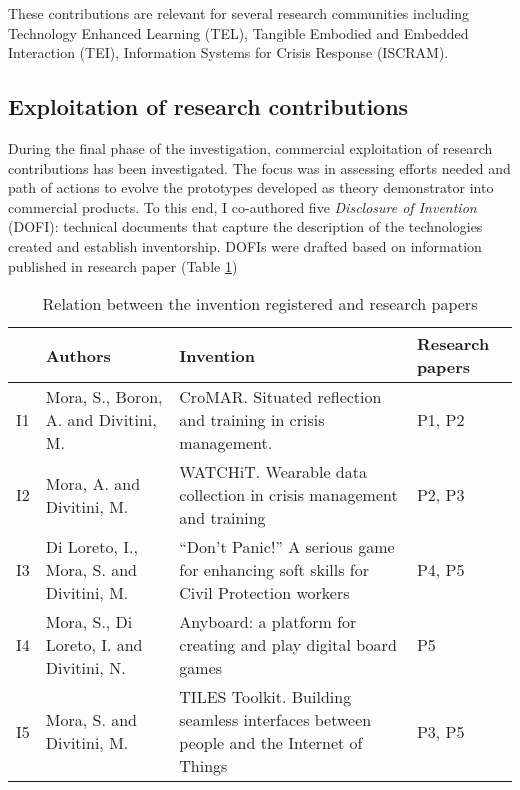These contributions are relevant for several research communities including Technology Enhanced Learning (TEL), Tangible Embodied and Embedded Interaction (TEI), Information Systems for Crisis Response (ISCRAM).

\subsection{Exploitation of research contributions}\label{exploitation-of-research-contributions}

During the final phase of the investigation, commercial exploitation of research contributions has been investigated. The focus was in assessing efforts needed and path of actions to evolve the prototypes developed as theory demonstrator into commercial products. To this end, I co-authored five \emph{Disclosure of Invention} (DOFI): technical documents that capture the description of the technologies created and establish inventorship. DOFIs were drafted based on information published in research paper (Table \ref{tab:papers-inventions})
\begin{table}
	[tbh] \centering \caption{Relation between the invention registered and research papers} \label{tab:papers-inventions} 
	\begin{tabular}
		{p{}p{}p{}p{}} \toprule & Authors & Invention & Research papers \\
		\midrule I1 & Mora, S., Boron, A. and Divitini, M. & CroMAR. Situated reflection and training in crisis management. & P1, P2 \\
		\noalign{\smallskip} I2 & Mora, A. and Divitini, M. & WATCHiT. Wearable data collection in crisis management and training & P2, P3 \\
		\noalign{\smallskip} I3 & Di Loreto, I., Mora, S. and Divitini, M. & ``Don’t Panic!'' A serious game for enhancing soft skills for Civil Protection workers & P4, P5 \\
		\noalign{\smallskip} I4 & Mora, S., Di Loreto, I. and Divitini, N. & Anyboard: a platform for creating and play digital board games & P5 \\
		\noalign{\smallskip} I5 & Mora, S. and Divitini, M. & TILES Toolkit. Building seamless interfaces between people and the Internet of Things & P3, P5 \\
		\bottomrule 
	\end{tabular}
\end{table}

